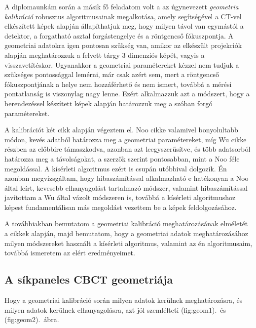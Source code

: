 \documentclass[a4paper,12pt]{article}
\begin{document}
A diplomaunkám során a másik fő feladatom volt a  az úgynevezett \emph{geometria kalibráció} robusztus algoritmusainak megalkotása, amely segítségével a CT-vel elkészített képek alapján állapíthatjuk meg, hogy milyen távol van egymástól a detektor, a forgatható asztal forgástengelye és a röntgencső fókuszpontja. A geometriai adatokra igen pontosan szükség van, amikor az elkészült projekciók alapján meghatározzuk a felvett tárgy 3 dimenziós képét, vagyis a visszavetítéskor. Ugyanakkor a geometriai paramétereket kézzel nem tudjuk a szükséges pontossággal lemérni, már csak azért sem, mert a röntgencső fókuszpontjának a helye nem hozzáférhető és nem ismert, továbbá a mérési pontatlanság is viszonylag nagy lenne. Ezért alkalmazzuk azt a módszert, hogy a berendezéssel készített képek alapján határozzuk meg a szóban forgó paramétereket. 

A kalibrációt két cikk alapján végeztem el. Noo cikke\cite{noo} valamivel bonyolultabb  módon, kevés adatból határozza meg a geometriai paramétereket, míg Wu\cite{wu} cikke részben az előbbire támaszkodva, azonban azt leegyszerűsítve,  és több adatsorból határozza meg a távolságokat, a szerzők szerint pontosabban, mint a Noo féle megoldással. A kísérleti algoritmus ezért is csupán utóbbival dolgozik. Én azonban megvizsgáltam, hogy hibaszámítással alkalmazható e hatékonyan a Noo által leírt, kevesebb elhanyagolást tartalmazó módszer, valamint hibaszámítással javítottam a Wu által vázolt módszeren is, továbbá a kísérleti algoritmushoz képest fundamentálisan más megoldást vezettem be a képek feldolgozásához.

 A továbbiakban bemutatom a geometriai kalibráció meghatározásának elméletét a cikkek alapján, majd bemutatom, hogy a geometriai adatok meghatározásához milyen módszereket használt a kísérleti algoritmus, valamint az én algoritmusaim, továbbá ismeretem az elért eredményeimet. 

\subsection{A síkpaneles CBCT geometriája}

Hogy a geometriai kalibráció során milyen adatok kerülnek meghatározásra, és milyen adatok kerülnek elhanyagolásra, azt jól szemlélteti \aref({fig:geom1}).\ és \aref({fig:geom2}).~ábra. 
\end{document}
